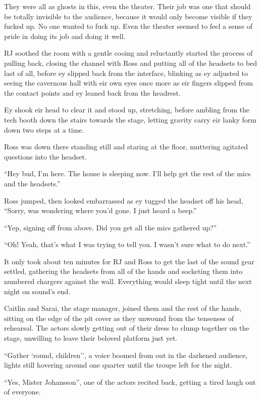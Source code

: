 They were all as ghosts in this, even the theater.  Their job was one that should be totally invisible to the audience, because it would only become visible if they fucked up.  No one wanted to fuck up.  Even the theater seemed to feel a sense of pride in doing its job and doing it well.

RJ soothed the room with a gentle cooing and reluctantly started the process of pulling back, closing the channel with Ross and putting all of the headsets to bed last of all, before ey slipped back from the interface, blinking as ey adjusted to seeing the cavernous hall with eir own eyes once more as eir fingers slipped from the contact points and ey leaned back from the headrest.

Ey shook eir head to clear it and stood up, stretching, before ambling from the tech booth down the stairs towards the stage, letting gravity carry eir lanky form down two steps at a time.

Ross was down there standing still and staring at the floor, muttering agitated questions into the headset.

``Hey bud, I'm here.  The house is sleeping now.  I'll help get the rest of the mics and the headsets.''

Ross jumped, then looked embarrassed as ey tugged the headset off his head, ``Sorry, was wondering where you'd gone.  I just heard a beep.''

``Yep, signing off from above.  Did you get all the mics gathered up?''

``Oh! Yeah, that's what I was trying to tell you.  I wasn't sure what to do next.''

It only took about ten minutes for RJ and Ross to get the last of the sound gear settled, gathering the headsets from all of the hands and socketing them into numbered chargers against the wall.  Everything would sleep tight until the next night on sound's end.

Caitlin and Sarai, the stage manager, joined them and the rest of the hands, sitting on the edge of the pit cover as they unwound from the tenseness of rehearsal.  The actors slowly getting out of their dress to clump together on the stage, unwilling to leave their beloved platform just yet.

``Gather `round, children'', a voice boomed from out in the darkened audience, lights still hovering around one quarter until the troupe left for the night.

``Yes, Mister Johansson'', one of the actors recited back, getting a tired laugh out of everyone.

